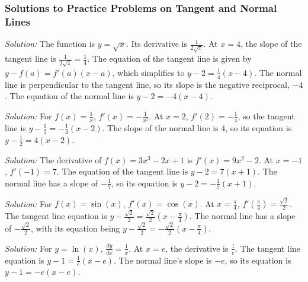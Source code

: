 \documentclass[a4paper,12pt]{book}
\newenvironment{solution}[1][]
{\par\noindent\textit{Solution:} \rmfamily}{\medskip}
\begin{document}
\subsubsection*{Solutions to Practice Problems on Tangent and Normal Lines}

\begin{solution}[to Problem 1]
The function is \( y = \sqrt{x} \). Its derivative is \( \frac{1}{2\sqrt{x}} \). At \( x = 4 \), the slope of the tangent line is \( \frac{1}{2\sqrt{4}} = \frac{1}{4} \). The equation of the tangent line is given by \( y - f(a) = f'(a)(x - a) \), which simplifies to \( y - 2 = \frac{1}{4}(x - 4) \). The normal line is perpendicular to the tangent line, so its slope is the negative reciprocal, \( -4 \). The equation of the normal line is \( y - 2 = -4(x - 4) \).
\end{solution}

\begin{solution}[to Problem 2]
For \( f(x) = \frac{1}{x} \), \( f'(x) = -\frac{1}{x^2} \). At \( x = 2 \), \( f'(2) = -\frac{1}{4} \), so the tangent line is \( y - \frac{1}{2} = -\frac{1}{4}(x - 2) \). The slope of the normal line is \( 4 \), so its equation is \( y - \frac{1}{2} = 4(x - 2) \).
\end{solution}

\begin{solution}[to Problem 3]
The derivative of \( f(x) = 3x^3 - 2x + 1 \) is \( f'(x) = 9x^2 - 2 \). At \( x = -1 \), \( f'(-1) = 7 \). The equation of the tangent line is \( y - 2 = 7(x + 1) \). The normal line has a slope of \( -\frac{1}{7} \), so its equation is \( y - 2 = -\frac{1}{7}(x + 1) \).
\end{solution}

\begin{solution}[to Problem 4]
For \( f(x) = \sin(x) \), \( f'(x) = \cos(x) \). At \( x = \frac{\pi}{4} \), \( f'\left(\frac{\pi}{4}\right) = \frac{\sqrt{2}}{2} \). The tangent line equation is \( y - \frac{\sqrt{2}}{2} = \frac{\sqrt{2}}{2}\left(x - \frac{\pi}{4}\right) \). The normal line has a slope of \( -\frac{\sqrt{2}}{2} \), with its equation being \( y - \frac{\sqrt{2}}{2} = -\frac{\sqrt{2}}{2}\left(x - \frac{\pi}{4}\right) \).
\end{solution}

\begin{solution}[to Problem 5]
For \( y = \ln(x) \), \( \frac{dy}{dx} = \frac{1}{x} \). At \( x = e \), the derivative is \( \frac{1}{e} \). The tangent line equation is \( y - 1 = \frac{1}{e}(x - e) \). The normal line's slope is \( -e \), so its equation is \( y - 1 = -e(x - e) \).
\end{solution}
\end{document}
